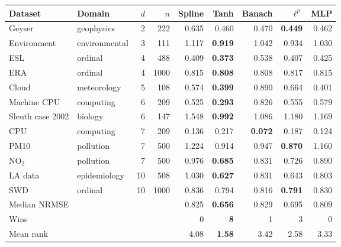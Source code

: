 \begin{tabular}{llrrrrrrr}
\toprule
Dataset & Domain & $d$ & $n$ & Spline & Tanh & Banach & $\ell^p$ & MLP \\
\midrule
Geyser & geophysics & 2 & 222 & 0.635 & 0.460 & 0.470 & \textbf{0.449} & 0.462 \\
Environment & environmental & 3 & 111 & 1.117 & \textbf{0.919} & 1.042 & 0.934 & 1.030 \\
ESL & ordinal & 4 & 488 & 0.409 & \textbf{0.373} & 0.538 & 0.407 & 0.425 \\
ERA & ordinal & 4 & 1000 & 0.815 & \textbf{0.808} & 0.808 & 0.817 & 0.815 \\
Cloud & meteorology & 5 & 108 & 0.574 & \textbf{0.399} & 0.890 & 0.664 & 0.401 \\
Machine CPU & computing & 6 & 209 & 0.525 & \textbf{0.293} & 0.826 & 0.555 & 0.579 \\
Sleuth case 2002 & biology & 6 & 147 & 1.548 & \textbf{0.992} & 1.086 & 1.180 & 1.169 \\
CPU & computing & 7 & 209 & 0.136 & 0.217 & \textbf{0.072} & 0.187 & 0.124 \\
PM10 & pollution & 7 & 500 & 1.224 & 0.914 & 0.947 & \textbf{0.870} & 1.160 \\
NO$_2$ & pollution & 7 & 500 & 0.976 & \textbf{0.685} & 0.831 & 0.726 & 0.890 \\
LA data & epidemiology & 10 & 508 & 1.030 & \textbf{0.627} & 0.831 & 0.643 & 0.803 \\
SWD & ordinal & 10 & 1000 & 0.836 & 0.794 & 0.816 & \textbf{0.791} & 0.830 \\
\midrule
Median NRMSE & \multicolumn{3}{c}{} & 0.825 & \textbf{0.656} & 0.829 & 0.695 & 0.809 \\
Wins & \multicolumn{3}{c}{} & 0 & \textbf{8} & 1 & 3 & 0 \\
Mean rank & \multicolumn{3}{c}{} & 4.08 & \textbf{1.58} & 3.42 & 2.58 & 3.33 \\
\bottomrule\end{tabular}
